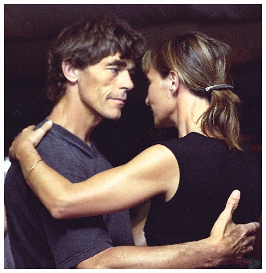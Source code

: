 \begin{center}

\vspace{5cm}


\label{OneRicardo}\includegraphics[scale=1.5]{dance/Eltaita-reduc}

\end{center}
